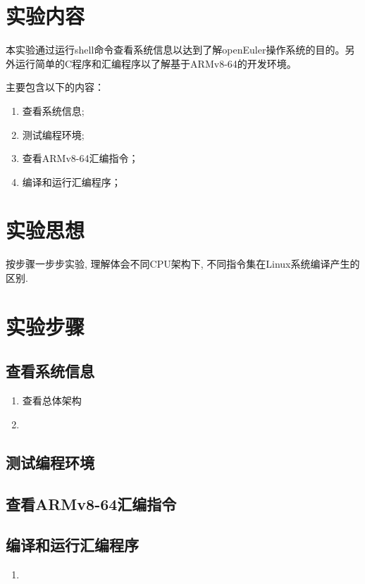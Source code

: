 \documentclass[forprint]{plainAssign}
\begin{document}
 \section{实验内容}
 本实验通过运行shell命令查看系统信息以达到了解openEuler操作系统的目的。另外运行简单的C程序和汇编程序以了解基于ARMv8-64的开发环境。
 
 主要包含以下的内容：
 \begin{enumerate}
 	\item 查看系统信息;
 	\item 测试编程环境;
 	\item 查看ARMv8-64汇编指令；
 	\item 编译和运行汇编程序；
 \end{enumerate}

 \section{实验思想}
按步骤一步步实验, 理解体会不同CPU架构下, 不同指令集在Linux系统编译产生的区别. 
 \section{实验步骤}
 \subsection{查看系统信息}
 \begin{enumerate}[step.1]
 	\item 查看总体架构 \\ 
 	\item 
 \end{enumerate}
 
 \subsection{测试编程环境}

 \subsection{查看ARMv8-64汇编指令}
 
 \subsection{编译和运行汇编程序}
 
  \begin{enumerate}[step.1]
 	\item 
  \end{enumerate}
 
\end{document}
